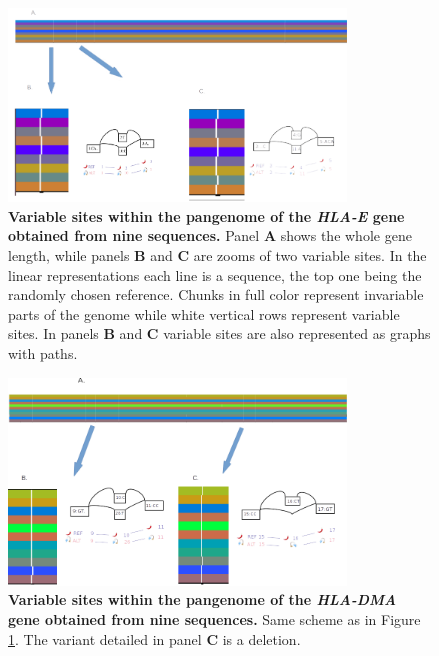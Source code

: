 \begin{figure}[H]
\centering
\includegraphics[width=0.80\textwidth]{fig/HLA-E.png}
\decoRule
\caption{\textbf{Variable sites within the pangenome of the \textit{HLA-E} gene obtained from nine sequences.} Panel \textbf{A} shows the whole gene length, while panels \textbf{B} and \textbf{C} are zooms of two variable sites. In the linear representations each line is a sequence, the top one being the randomly chosen reference. Chunks in full color represent invariable parts of the genome while white vertical rows represent variable sites. In panels \textbf{B} and \textbf{C} variable sites are also represented as graphs with paths.}
\label{fig:hla-e.pdf}
\end{figure}



\begin{figure}[H]
\centering
\includegraphics[width=0.80\textwidth]{fig/HLA-DMA.png}
\decoRule
\caption{\textbf{Variable sites within the pangenome of the \textit{HLA-DMA} gene obtained from nine sequences.} Same scheme as in Figure \ref{fig:hla-e.pdf}. The variant detailed in panel \textbf{C} is a deletion.}
\label{fig:hla-dma.pdf}
\end{figure}







